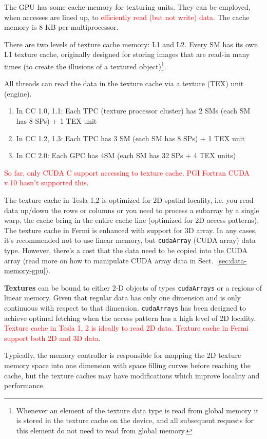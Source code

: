 \begin{framed}
  The GPU has some cache memory for texturing units. They can be
  employed, when accesses are lined up, to
  \textcolor{red}{efficiently read (but not write) data}. The cache
  memory is 8 KB per multiprocessor.
\end{framed}


There are two levels of texture cache memory: L1 and L2. Every
SM has its own L1 texture cache, originally designed for storing
images that are read-in many times (to create the illusions of a
textured
object)\footnote{Whenever an element of the texture data type is read
  from global memory it is stored in the texture cache on the device,
  and all subsequent requests for this element do not need to read
  from global memory.}.

All threads can read the data in the texture cache via a texture (TEX)
unit (engine). 
\begin{enumerate}
\item In CC 1.0, 1.1: Each TPC (texture processor cluster) has 2 SMs
  (each SM has 8 SPs) + 1 TEX unit
\item In CC 1.2, 1.3: Each TPC has 3 SM (each SM has 8 SPs) + 1 TEX
  unit
\item In CC 2.0: Each GPC has 4SM (each SM has 32 SPs + 4 TEX units)
\end{enumerate}
\textcolor{red}{So far, only CUDA C support accessing to texture
  cache. PGI Fortran CUDA v.10 hasn't supported this}.


The texture cache in Tesla 1,2 is optimized for 2D spatial locality,
i.e. you read data up/down the rows or columns or you need to process
a subarray by a single warp, the cache bring in the entire cache line
(optimized for 2D access patterns). The texture cache in Fermi is
enhanced with support for 3D array. In any cases, it's recommended not
to use linear memory, but \verb!cudaArray! (CUDA array) data
type. However, there's a cost that the data need to be copied into the
CUDA array (read more on how to manipulate CUDA array data in
Sect.~\ref{sec:data-memory-gpu}).

\begin{framed}
  {\bf Textures} can be bound to either 2-D objects of types
  \verb!cudaArrays! or a regions of linear memory. Given that regular
  data has only one dimension and is only continuous with respect to
  that dimension.  \verb!cudaArrays! has been designed to achieve
  optimal fetching when the access pattern has a high level of 2D
  locality.
  \textcolor{red}{ Texture cache in Tesla 1, 2 is ideally to read 2D
    data. Texture cache in Fermi support both 2D and 3D data}.

  Typically, the memory controller is responsible for mapping the 2D
  texture memory space into one dimension with space filling curves
  before reaching the cache, but the texture caches may have
  modifications which improve locality and performance.

\end{framed}

